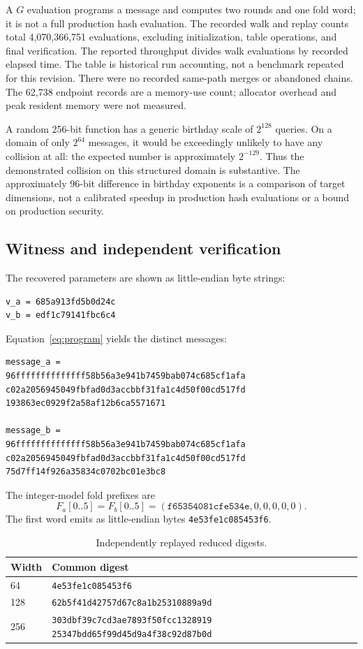 \documentclass[10pt]{article}
\theoremstyle{definition}
\newcommand{\code}[1]{\texttt{#1}}
\begin{document}
A $G$ evaluation programs a message and computes two rounds and one fold word; it is not a full production hash evaluation. The recorded walk and replay counts total 4,070,366,751 evaluations, excluding initialization, table operations, and final verification. The reported throughput divides walk evaluations by recorded elapsed time. The table is historical run accounting, not a benchmark repeated for this revision. There were no recorded same-path merges or abandoned chains. The 62,738 endpoint records are a memory-use count; allocator overhead and peak resident memory were not measured.

A random 256-bit function has a generic birthday scale of $2^{128}$ queries. On a domain of only $2^{64}$ messages, it would be exceedingly unlikely to have any collision at all: the expected number is approximately $2^{-129}$. Thus the demonstrated collision on this structured domain is substantive. The approximately 96-bit difference in birthday exponents is a comparison of target dimensions, not a calibrated speedup in production hash evaluations or a bound on production security.

\subsection{Witness and independent verification}
\label{sec:witness}

The recovered parameters are shown as little-endian byte strings:
\begin{lstlisting}[style=code]
v_a = 685a913fd5b0d24c
v_b = edf1c79141fbc6c4
\end{lstlisting}

Equation~\eqref{eq:program} yields the distinct messages:
\begin{lstlisting}[style=code]
message_a =
96ffffffffffffff58b56a3e941b7459bab074c685cf1afa
c02a2056945049fbfad0d3accbbf31fa1c4d50f00cd517fd
193863ec0929f2a58af12b6ca5571671

message_b =
96ffffffffffffff58b56a3e941b7459bab074c685cf1afa
c02a2056945049fbfad0d3accbbf31fa1c4d50f00cd517fd
75d7ff14f926a35834c0702bc01e3bc8
\end{lstlisting}

The integer-model fold prefixes are
\[
F_a[0..5]=F_b[0..5]=
(\mathtt{f65354081cfe534e},0,0,0,0,0).
\]
The first word emits as little-endian bytes \code{4e53fe1c085453f6}.

\begin{table}[ht]
\centering
\caption{Independently replayed reduced digests.}
\begin{tabularx}{\linewidth}{@{}lX@{}}
\toprule
Width & Common digest \\
\midrule
64 & \code{4e53fe1c085453f6} \\
128 & \code{62b5f41d42757d67c8a1b25310889a9d} \\
256 & \code{303dbf39c7cd3ae7893f50fcc1328919}\newline
      \code{25347bdd65f99d45d9a4f38c92d87b0d} \\
\bottomrule
\end{tabularx}
\end{table}
\end{document}
